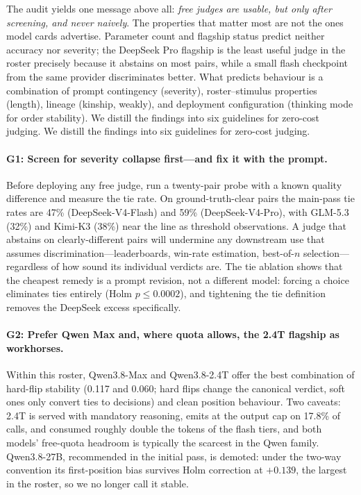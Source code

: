 \documentclass[review,12pt]{elsarticle}
\begin{document}
The audit yields one message above all: \emph{free judges are usable, but
only after screening, and never naively}. The properties that matter most
are not the ones model cards advertise. Parameter count and flagship status
predict neither accuracy nor severity; the DeepSeek Pro flagship is the
least useful judge in the roster precisely because it abstains on most
pairs, while a small flash checkpoint from the same provider discriminates
better. What predicts behaviour is a combination of prompt contingency
(severity), roster--stimulus properties (length), lineage (kinship,
weakly), and deployment configuration (thinking mode for order
stability). We distill the findings into six guidelines for zero-cost
judging. We distill
the findings into six guidelines for zero-cost judging.

\paragraph{G1: Screen for severity collapse first---and fix it with the
prompt.}
Before deploying any free judge, run a twenty-pair probe with a known
quality difference and measure the tie rate. On ground-truth-clear pairs
the main-pass tie rates are 47\% (DeepSeek-V4-Flash) and 59\%
(DeepSeek-V4-Pro), with GLM-5.3 (32\%) and Kimi-K3 (38\%) near the line
as threshold observations. A judge that abstains on clearly-different
pairs will undermine any downstream use that assumes
discrimination---leaderboards, win-rate estimation, best-of-$n$
selection---regardless of how sound its individual verdicts are. The tie
ablation shows that the cheapest remedy is a prompt revision, not a
different model: forcing a choice eliminates ties entirely (Holm
$p\le 0.0002$), and tightening the tie definition removes the DeepSeek
excess specifically.

\paragraph{G2: Prefer Qwen Max and, where quota allows, the 2.4T
flagship as workhorses.}
Within this roster, Qwen3.8-Max and Qwen3.8-2.4T offer the best
combination of hard-flip stability (0.117 and 0.060; hard flips change
the canonical verdict, soft ones only convert ties to decisions) and
clean position behaviour. Two caveats: 2.4T is served with mandatory
reasoning, emits at the output cap on 17.8\% of calls, and consumed
roughly double the tokens of the flash tiers, and both models' free-quota
headroom is typically the scarcest in the Qwen family. Qwen3.8-27B,
recommended in the initial pass, is demoted: under the two-way convention
its first-position bias survives Holm correction at $+0.139$, the
largest in the roster, so we no longer call it stable.
\end{document}
